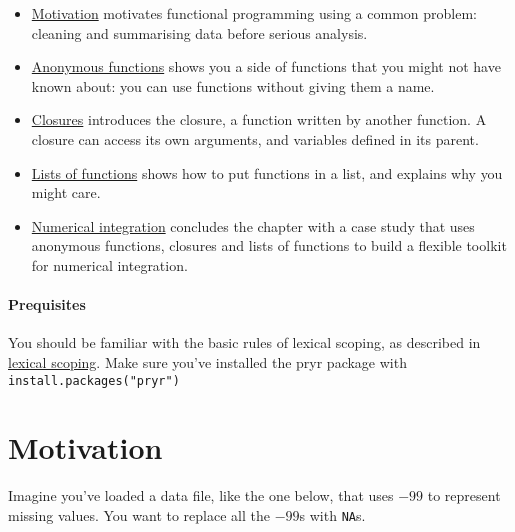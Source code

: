 \begin{itemize}
\item
  \protect\hyperlink{fp-motivation}{Motivation} motivates functional
  programming using a common problem: cleaning and summarising data
  before serious analysis.
\item
  \protect\hyperlink{anonymous-functions}{Anonymous functions} shows you
  a side of functions that you might not have known about: you can use
  functions without giving them a name.
\item
  \protect\hyperlink{closures}{Closures} introduces the closure, a
  function written by another function. A closure can access its own
  arguments, and variables defined in its parent.
\item
  \protect\hyperlink{lists-of-functions}{Lists of functions} shows how
  to put functions in a list, and explains why you might care.
\item
  \protect\hyperlink{numerical-integration}{Numerical integration}
  concludes the chapter with a case study that uses anonymous functions,
  closures and lists of functions to build a flexible toolkit for
  numerical integration.
\end{itemize}

\hypertarget{prequisites}{%
\paragraph{Prequisites}\label{prequisites}}

You should be familiar with the basic rules of lexical scoping, as
described in \protect\hyperlink{lexical-scoping}{lexical scoping}. Make
sure you've installed the pryr package with
\texttt{install.packages("pryr")}

\hypertarget{fp-motivation}{%
\section{Motivation}\label{fp-motivation}}

Imagine you've loaded a data file, like the one below, that uses \(-99\)
to represent missing values. You want to replace all the \(-99\)s with
\texttt{NA}s.

\begin{Shaded}
\begin{Highlighting}[]
\NormalTok{(}\NormalTok{)}
\StringTok{ }\NormalTok{(}\NormalTok{(}\NormalTok{, }\NormalTok{(}\NormalTok{(}\OperatorTok{:}\NormalTok{, }\NormalTok{), }\NormalTok{, } \NormalTok{)))}
\StringTok{ }\NormalTok{letters[}\OperatorTok{:}\NormalTok{]}
\end{Highlighting}
\end{Shaded}

